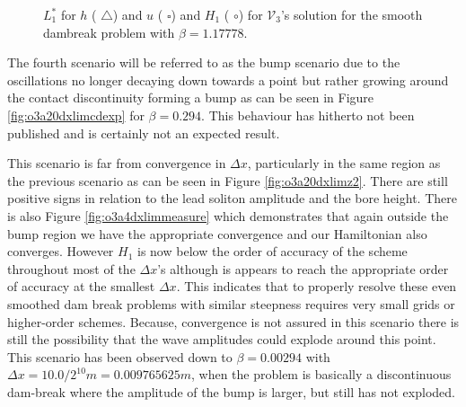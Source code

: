 \documentclass[SingleSpace,12pt,Journal]{Serre_ASCE}
\begin{document}
\begin{figure}
\centering
{}
\caption{$L^*_1$ for $h$ ({\color{red} $\triangle$}) and $u$ ({\color{blue} $\square$}) and $H_1$ ({\color{blue} $\circ$}) for $\mathcal{V}_3$'s solution for the smooth dambreak problem with $\beta = 1.17778$.}
\label{fig:o3a3dxlimmeasure}
\end{figure}


The fourth scenario will be referred to as the bump scenario due to the oscillations no longer decaying down towards a point but rather growing around the contact discontinuity forming a bump as can be seen in Figure \ref{fig:o3a20dxlimcdexp} for $\beta = 0.294$. This behaviour has hitherto not been published and is certainly not an expected result. 

This scenario is far from convergence in $\Delta x$, particularly in the same region as the previous scenario as can be seen in Figure \ref{fig:o3a20dxlimz2}. There are still positive signs in relation to the lead soliton amplitude and the bore height. There is also Figure \ref{fig:o3a4dxlimmeasure} which demonstrates that again outside the bump region we have the appropriate convergence and our Hamiltonian also converges. However $H_1$ is now below the order of accuracy of the scheme throughout most of the $\Delta x$'s although is appears to reach the appropriate order of accuracy at the smallest $\Delta x$. This indicates that to properly resolve these even smoothed dam break problems with similar steepness requires very small grids or higher-order schemes. Because, convergence is not assured in this scenario there is still the possibility that the wave amplitudes could explode around this point. This scenario has been observed down to $\beta = 0.00294$ with $\Delta x = 10.0/ 2^10m = 0.009765625m$, when the problem is basically a discontinuous dam-break where the amplitude of the bump is larger, but still has not exploded.
\end{document}
